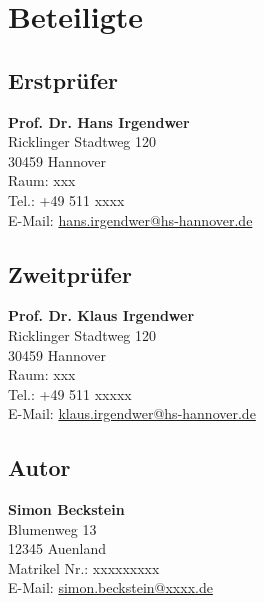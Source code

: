 \chapter*{Beteiligte}
\begin{minipage}{\textwidth}

	\section*{Erstprüfer}
	\textbf{Prof. Dr. Hans Irgendwer}\\
	Ricklinger Stadtweg 120\\
	30459  Hannover\\
	
	Raum: xxx\\
	Tel.: +49 511 xxxx\\
	E-Mail: \href{mailto:hans.irgendwer@hs-hannover.de}{hans.irgendwer@hs-hannover.de}
	
	\section*{Zweitprüfer}
	\textbf{Prof. Dr. Klaus Irgendwer}\\
	Ricklinger Stadtweg 120\\
	30459  Hannover\\
	
	Raum: xxx\\
	Tel.: +49 511 xxxxx\\
	E-Mail: \href{mailto:klaus.irgendwer@hs-hannover.de}{klaus.irgendwer@hs-hannover.de}
	
	
	\section*{Autor}
	\textbf{Simon Beckstein}\\
	Blumenweg 13\\
	12345 Auenland\\
	
	Matrikel Nr.: xxxxxxxxx\\
	E-Mail: \href{mailto:simon.beckstein@xxxx.de}{simon.beckstein@xxxx.de}
\end{minipage}


